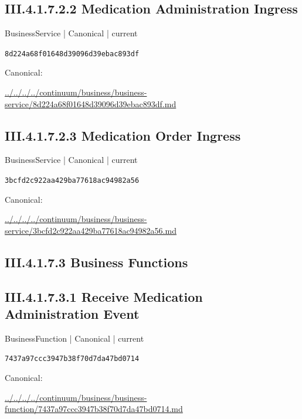 \documentclass[10pt,a4paper]{article}
\begin{document}
\subsection*{III.4.1.7.2.2 Medication Administration Ingress}
\label{element-8d224a68f01648d39096d39ebac893df}
{\small BusinessService | Canonical | current}\par
\texttt{8d224a68f01648d39096d39ebac893df}\par
Canonical: \par
{\footnotesize\url{../../../../continuum/business/business-service/8d224a68f01648d39096d39ebac893df.md}}\par
\subsection*{III.4.1.7.2.3 Medication Order Ingress}
\label{element-3bcfd2c922aa429ba77618ac94982a56}
{\small BusinessService | Canonical | current}\par
\texttt{3bcfd2c922aa429ba77618ac94982a56}\par
Canonical: \par
{\footnotesize\url{../../../../continuum/business/business-service/3bcfd2c922aa429ba77618ac94982a56.md}}\par
\subsection*{III.4.1.7.3 Business Functions}
\subsection*{III.4.1.7.3.1 Receive Medication Administration Event}
\label{element-7437a97ccc3947b38f70d7da47bd0714}
{\small BusinessFunction | Canonical | current}\par
\texttt{7437a97ccc3947b38f70d7da47bd0714}\par
Canonical: \par
{\footnotesize\url{../../../../continuum/business/business-function/7437a97ccc3947b38f70d7da47bd0714.md}}\par
\end{document}
